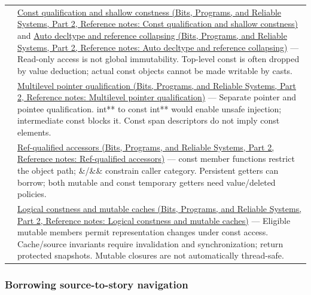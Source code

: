 {\begin{longtable}[]{@{}
  >{\raggedright\arraybackslash}p{}
  >{\raggedright\arraybackslash}p{}@{}}
123 & \href{../01-Bits-Programs-and-Reliable-Systems-P02/main.pdf\#appendix-c25d60fed375}{Const qualification and shallow constness (Bits, Programs, and Reliable Systems, Part 2, Reference notes: Const qualification and shallow constness)} and \href{../01-Bits-Programs-and-Reliable-Systems-P02/main.pdf\#appendix-5d4252a42886}{Auto decltype and reference collapsing (Bits, Programs, and Reliable Systems, Part 2, Reference notes: Auto decltype and reference collapsing)} --- Read-only access is not global immutability. Top-level const is often dropped by value deduction; actual const objects cannot be made writable by casts. \\
124 & \href{../01-Bits-Programs-and-Reliable-Systems-P02/main.pdf\#appendix-5e1a7561cd98}{Multilevel pointer qualification (Bits, Programs, and Reliable Systems, Part 2, Reference notes: Multilevel pointer qualification)} --- Separate pointer and pointee qualification. int** to const int** would enable unsafe injection; intermediate const blocks it. Const span descriptors do not imply const elements. \\
125 & \href{../01-Bits-Programs-and-Reliable-Systems-P02/main.pdf\#appendix-d42039b1d6f7}{Ref-qualified accessors (Bits, Programs, and Reliable Systems, Part 2, Reference notes: Ref-qualified accessors)} --- const member functions restrict the object path; \&/\&\& constrain caller category. Persistent getters can borrow; both mutable and const temporary getters need value/deleted policies. \\
126 & \href{../01-Bits-Programs-and-Reliable-Systems-P02/main.pdf\#appendix-f5593256bcaf}{Logical constness and mutable caches (Bits, Programs, and Reliable Systems, Part 2, Reference notes: Logical constness and mutable caches)} --- Eligible mutable members permit representation changes under const access. Cache/source invariants require invalidation and synchronization; return protected snapshots. Mutable closures are not automatically thread-safe. \\
\end{longtable}
}

\subsubsection{Borrowing source-to-story navigation}\label{appendix-fd090d982a15-borrowing-source-to-story-navigation}

\hypertarget{appendix-fd090d982a15-borrowing-source-to-story-navigation}{}

